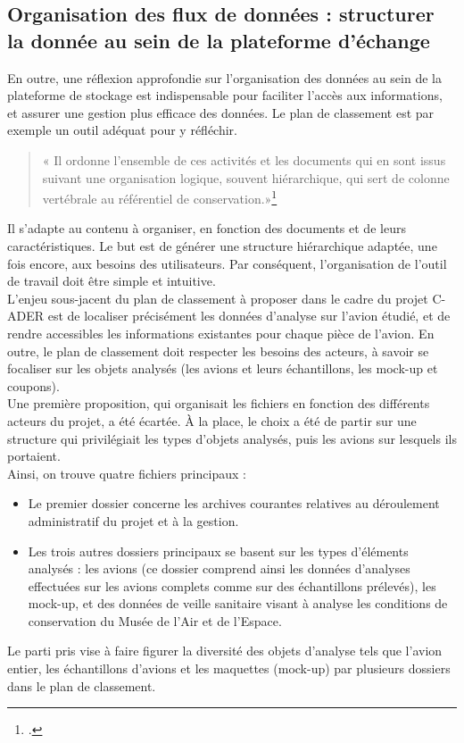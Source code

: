         \subsection{Organisation des flux de données : structurer la donnée au sein de la plateforme d’échange}

En outre, une réflexion approfondie sur l'organisation des données au sein de la plateforme de stockage est indispensable pour faciliter l'accès aux informations, et assurer une gestion plus efficace des données. Le plan de classement est par exemple un outil adéquat pour y réfléchir. 
\begin{quote}
    « Il ordonne l’ensemble de ces activités et les documents qui en sont issus suivant une organisation logique, souvent hiérarchique, qui sert de colonne vertébrale au référentiel de conservation.»\footcite{chabinGlossaireArchivage2010}
\end{quote} 
Il s’adapte au contenu à organiser, en fonction des documents et de leurs caractéristiques. Le but est de générer une structure hiérarchique adaptée, une fois encore, aux besoins des utilisateurs. Par conséquent, l’organisation de l’outil de travail doit être simple et intuitive.\\

L’enjeu sous-jacent du plan de classement à proposer dans le cadre du projet C-ADER est de localiser précisément les données d’analyse sur l’avion étudié, et de rendre accessibles les informations existantes pour chaque pièce de l’avion. En outre, le plan de classement doit respecter les besoins des acteurs, à savoir se focaliser sur les objets analysés (les avions et leurs échantillons, les mock-up et coupons).\\

Une première proposition, qui organisait les fichiers en fonction des différents acteurs du projet, a été écartée. À la place, le choix a été de partir sur une structure qui privilégiait les types d’objets analysés, puis les avions sur lesquels ils portaient.\\

Ainsi, on trouve quatre fichiers principaux : 
\begin{itemize}
      \item Le premier dossier concerne les archives courantes relatives au déroulement administratif du projet et à la gestion. 
      \item Les trois autres dossiers principaux se basent sur les types d’éléments analysés : les avions (ce dossier comprend ainsi les données d’analyses effectuées sur les avions complets comme sur des échantillons prélevés), les mock-up, et des données de veille sanitaire visant à analyse les conditions de conservation du Musée de l’Air et de l’Espace.
\end{itemize}
Le parti pris vise à faire figurer la diversité des objets d’analyse tels que l'avion entier, les échantillons d'avions et les maquettes (mock-up) par plusieurs dossiers dans le plan de classement.\\

